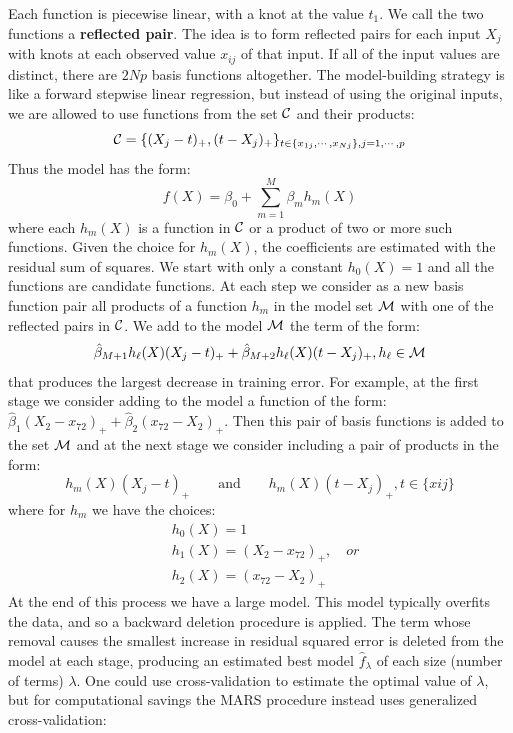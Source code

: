 Each function is piecewise linear, with a knot at the value $t_1$. We call the two functions a \textbf{reflected pair}. The idea is to form reflected pairs for each input $X_j$ with knots at each observed value $x_{ij}$ of that input. If all of the input values are distinct, there are $2Np$ basis functions altogether.
The model-building strategy is like a forward stepwise linear regression, but instead of using the original inputs, we are allowed to use functions from the set $\CMcal{C}$ and their products:
\begin{equation}
\CMcal{C} = \{(X_j-t)_+, (t-X_j)_+\}_{t \in \{x_{1j},\cdots, x_{Nj}\}, j=1,\cdots,p}
\end{equation}
Thus the model has the form:
\begin{equation}
f(X) = \beta_0 + \sum_{m=1}^M \beta_m h_m(X)
\end{equation}
where each $h_m(X)$ is a function in $\CMcal{C}$ or a product of two or more such functions. Given the choice for $h_m(X)$, the coefficients are estimated with the residual sum of squares. We start with only a constant $h_0(X)=1$ and all the functions are candidate functions. At each step we consider as a new basis function pair all products of a function $h_m$ in the model set $\CMcal{M}$ with one of the reflected pairs in $\CMcal{C}$. We add to the model $\CMcal{M}$ the term of the form:
\begin{equation}
\hat{\beta}_{M+1}h_\ell(X) (X_j-t)_+ + \hat{\beta}_{M+2}h_\ell(X) (t-X_j)_+, h_\ell \in \CMcal{M}
\end{equation}
that produces the largest decrease in training error. For example, at the first stage we consider adding to the model a function of the form: $\hat{\beta}_1 (X_2-x_{72})_+ + \hat{\beta}_2(x_{72}-X_2)_+$. Then this pair of basis functions is added to the set $\CMcal{M}$ and at the next stage we consider including a pair of products in the form:
\begin{equation}
h_m(X) (X_j-t)_+ \quad\quad \text{and}\quad\quad h_m(X) (t-X_j)_+, t \in \{x{ij}\}
\end{equation}
where for $h_m$ we have the choices:
\begin{equation}
\begin{aligned}
&h_0(X) = 1\\
&h_1(X) = (X_2 - x_{72})_+,  \quad\textit{or}\\
&h_2(X) = (x_{72} - X_2)_+
\end{aligned}
\end{equation}
At the end of this process we have a large model. This model typically overfits the data, and so a backward deletion procedure is applied. The term whose removal causes the smallest increase in residual squared error is deleted from the model at each stage, producing an estimated best model $\hat{f}_\lambda$ of each size (number of terms) $\lambda$. One could use cross-validation to estimate the optimal value of $\lambda$, but for computational savings the MARS procedure instead uses generalized cross-validation:
